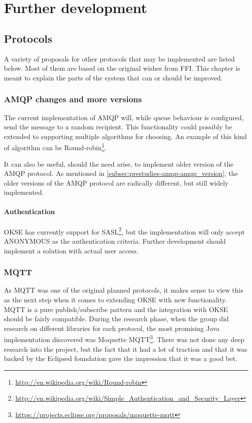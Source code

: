 
\chapter{Further development}

\section{Protocols}
A variety of proposals for other protocols that may be implemented are listed below. Most of them are based on the original wishes from FFI. This chapter is meant to explain the parts of the system that can or should be improved. 

\subsection{AMQP changes and more versions}
The current implementation of AMQP will, while queue behaviour is configured, send the message to a random recipient. This functionality could possibly be extended to supporting multiple algorithms for choosing. An example of this kind of algorithm can be Round-robin\footnote{\url{http://en.wikipedia.org/wiki/Round-robin}}.

It can also be useful, should the need arise, to implement older version of the AMQP protocol. As mentioned in \ref{subsec:prestudies-amqp-amqp_version}, the older versions of the AMQP protocol are radically different, but still widely implemented.

\subsubsection{Authentication}
OKSE has currently support for SASL\footnote{\url{http://en.wikipedia.org/wiki/Simple_Authentication_and_Security_Layer}}, but the implementation will only accept ANONYMOUS as the authentication criteria. Further development should implement a solution with actual user access. 

\subsection{MQTT}
As MQTT was one of the original planned protocols, it makes sense to view this as the next step when it comes to extending OKSE with new functionality. MQTT is a pure publish/subscribe pattern and the integration with OKSE should be fairly compatible. 
During the research phase, when the group did research on different libraries for each protocol, the most promising Java implementation discovered was Moquette MQTT\footnote{\url{https://projects.eclipse.org/proposals/moquette-mqtt}}. There was not done any deep research into the project, but the fact that it had a lot of traction and that it was backed by the Eclipsed foundation gave the impression that it was a good bet.

